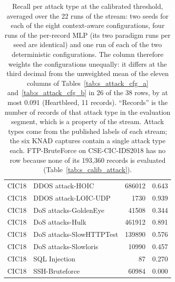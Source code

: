 \begin{table}[ht]
\begin{tabular}{llrr}
CIC18 & DDOS attack-HOIC & 686012 & 0.643\\
CIC18 & DDOS attack-LOIC-UDP & 1730 & 0.939\\
CIC18 & DoS attacks-GoldenEye & 41508 & 0.344\\
CIC18 & DoS attacks-Hulk & 461912 & 0.891\\
CIC18 & DoS attacks-SlowHTTPTest & 139890 & 0.576\\
CIC18 & DoS attacks-Slowloris & 10990 & 0.457\\
CIC18 & SQL Injection & 87 & 0.270\\
CIC18 & SSH-Bruteforce & 60984 & 0.000\\
\hline
\end{tabular}
\caption{Recall per attack type at the calibrated threshold, averaged over the 22 runs of the stream: two seeds for each of the eight context-aware configurations, four runs of the per-record MLP (its two paradigm runs per seed are identical) and one run of each of the two deterministic configurations. The column therefore weights the configurations unequally: it differs at the third decimal from the unweighted mean of the eleven columns of Tables~\ref{tab:s_attack_cfg_a} and~\ref{tab:s_attack_cfg_b} in 26 of the 38 rows, by at most 0.091 (Heartbleed, 11 records). ``Records'' is the number of records of that attack type in the evaluation segment, which is a property of the stream. Attack types come from the published labels of each stream; the six KNAD captures contain a single attack type each. FTP-BruteForce on CSE-CIC-IDS2018 has no row because none of its 193{,}360 records is evaluated (Table~\ref{tab:s_calib_attack}).}\label{tab:s_attack}
\end{table}

